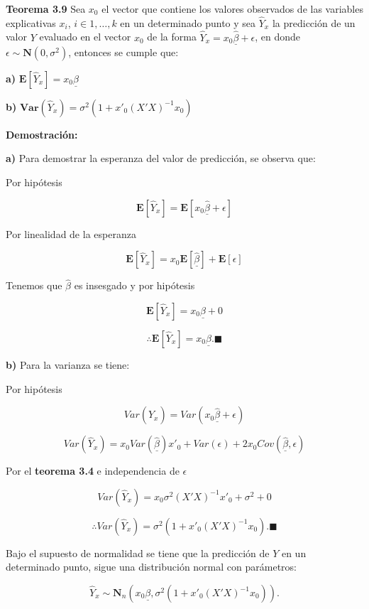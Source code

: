 \documentclass[
  a4paper,
  oneside,
  openany]{book}
\begin{document}
\textbf{Teorema 3.9} Sea \(x_{0}\) el vector que contiene los valores observados de las variables explicativas \(x_{i}\), \(i \in 1,\ldots,k\) en un determinado punto y sea \(\hat{Y}_{x}\) la predicción de un valor \(Y\) evaluado en el vector \(x_{0}\) de la forma \(\hat{Y}_{x}=x_{0}\underline{\hat{\beta}}+\epsilon\), en donde \(\epsilon \sim \mathbf{N}(0,\sigma^2)\), entonces se cumple que:

\textbf{a)} \(\mathbf{E}[\hat{Y}_{x}]=x_{0}\underline{\beta}\)

\textbf{b)} \(\textbf{Var}(\hat{Y}_{x})=\sigma^2\left(1+x'_{0}(X'X)^{-1}x_{0}\right)\)

\textbf{Demostración:}

\textbf{a)} Para demostrar la esperanza del valor de predicción, se observa que:

Por hipótesis

\[\mathbf{E}[\hat{Y}_{x}]=\mathbf{E}[x_{0}\underline{\hat{\beta}}+\epsilon]\]

Por linealidad de la esperanza

\[\mathbf{E}[\hat{Y}_{x}]=x_{0}\mathbf{E}[\underline{\hat{\beta}}]+\mathbf{E}[\epsilon]\]

Tenemos que \(\hat{\beta}\) es insesgado y por hipótesis

\[\mathbf{E}[\hat{Y}_{x}]=x_{0}\underline{\beta}+0\]

\[\therefore \mathbf{E}[\hat{Y}_{x}]=x_{0}\underline{\beta}. \blacksquare\]

\textbf{b)} Para la varianza se tiene:

Por hipótesis

\[Var(\hat{Y}_{x})=Var(x_{0}\underline{\hat{\beta}}+\epsilon)\]

\[Var(\hat{Y}_{x})=x_{0}Var(\underline{\hat{\beta}})x'_{0}+Var(\epsilon)+2x_{0}Cov(\underline{\hat{\beta}},\epsilon)\]

Por el \textbf{teorema 3.4} e independencia de \(\epsilon\)

\[Var(\hat{Y}_{x})=x_{0}\sigma^2(X'X)^{-1}x'_{0}+\sigma^2+0\]

\[\therefore Var(\hat{Y}_{x})=\sigma^2\left(1+x'_{0}(X'X)^{-1}x_{0}\right). \blacksquare\]

Bajo el supuesto de normalidad se tiene que la predicción de \(Y\) en un determinado punto, sigue una distribución normal con parámetros:

\[\hat{Y}_{x} \sim \mathbf{N}_{n} \left( x_{0}\underline{\beta}, \sigma^2\left(1+x'_{0}(X'X)^{-1}x_{0}\right)\right).\]
\end{document}
